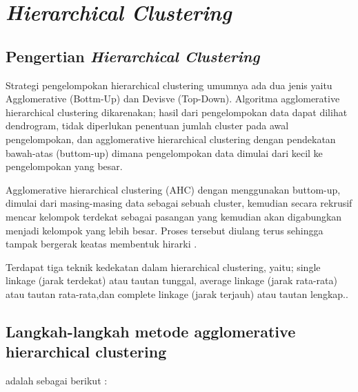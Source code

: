 
\section{\textit{Hierarchical Clustering}}
\subsection{Pengertian \textit{Hierarchical Clustering}}
\hspace{1cm}Strategi pengelompokan hierarchical clustering umumnya ada dua jenis yaitu Agglomerative (Bottm-Up) dan Devisve (Top-Down). Algoritma agglomerative hierarchical clustering dikarenakan; hasil dari pengelompokan data dapat dilihat dendrogram, tidak diperlukan penentuan jumlah cluster pada awal pengelompokan, dan agglomerative hierarchical clustering dengan pendekatan bawah-atas (buttom-up) dimana pengelompokan data dimulai dari kecil ke pengelompokan yang besar. 
\par\hspace{0.5cm}Agglomerative hierarchical clustering (AHC) dengan menggunakan buttom-up, dimulai dari masing-masing data sebagai sebuah cluster, kemudian secara rekrusif mencar kelompok terdekat sebagai pasangan yang kemudian akan digabungkan menjadi kelompok yang lebih besar. Proses tersebut diulang terus sehingga tampak bergerak keatas membentuk hirarki .
\par\hspace{1cm}Terdapat tiga teknik kedekatan dalam hierarchical clustering, yaitu; single linkage (jarak terdekat) atau tautan tunggal, average linkage (jarak rata-rata) atau tautan rata-rata,dan complete linkage (jarak terjauh) atau tautan lengkap.\citep*{pujakusuma2017pengelompokan}.

\subsection{Langkah-langkah metode agglomerative hierarchical
clustering}
adalah sebagai berikut \citep*{alpiana2019penerapan} :


